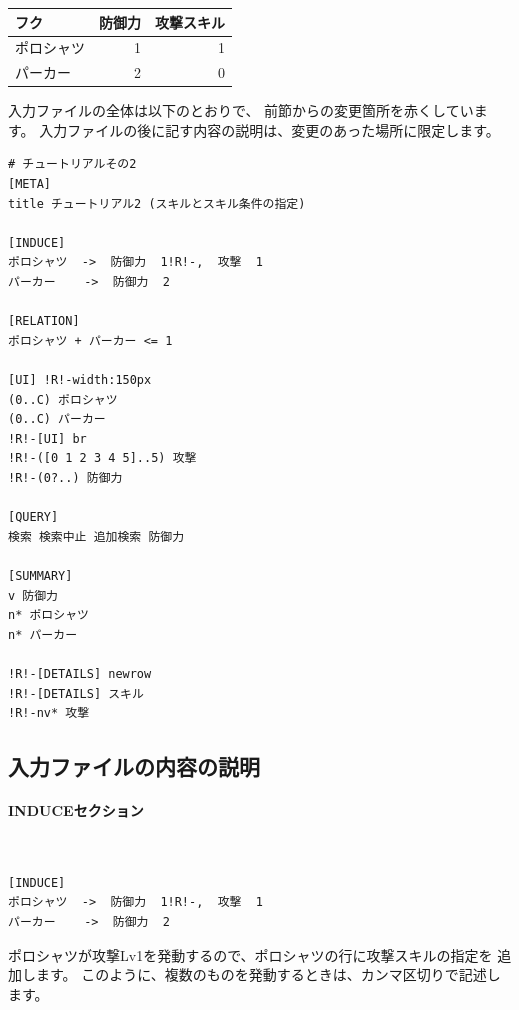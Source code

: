 \documentclass[dvipdfmx]{jsarticle}
\begin{document}
%
\begin{center}
\begin{tabular}{lrr}
\toprule
フク       & 防御力 & 攻撃スキル\\
\midrule
ポロシャツ & 1 & 1 \\
パーカー   & 2 & 0 \\
\bottomrule
\end{tabular}
\end{center}
%
入力ファイルの全体は以下のとおりで、
前節からの変更箇所を赤くしています。
入力ファイルの後に記す内容の説明は、変更のあった場所に限定します。
\medskip

{\footnotesize\begin{mdframed}\begin{Verbatim}[commandchars=!<>]
# チュートリアルその2
[META]
title チュートリアル2 (スキルとスキル条件の指定)

[INDUCE]
ポロシャツ  ->  防御力  1!R!-,  攻撃  1
パーカー    ->  防御力  2

[RELATION]
ポロシャツ + パーカー <= 1

[UI] !R!-width:150px
(0..C) ポロシャツ
(0..C) パーカー
!R!-[UI] br
!R!-([0 1 2 3 4 5]..5) 攻撃
!R!-(0?..) 防御力

[QUERY]
検索 検索中止 追加検索 防御力

[SUMMARY]
v 防御力
n* ポロシャツ
n* パーカー

!R!-[DETAILS] newrow
!R!-[DETAILS] スキル
!R!-nv* 攻撃
\end{Verbatim}
\end{mdframed}}

\subsection{入力ファイルの内容の説明}

\paragraph{INDUCEセクション}~\medskip
{\footnotesize\begin{mdframed}\begin{Verbatim}[commandchars=!<>]
[INDUCE]
ポロシャツ  ->  防御力  1!R!-,  攻撃  1
パーカー    ->  防御力  2
\end{Verbatim}
\end{mdframed}}
\medskip

ポロシャツが攻撃Lv1を発動するので、ポロシャツの行に攻撃スキルの指定を
追加します。
このように、複数のものを発動するときは、カンマ区切りで記述します。
\end{document}

